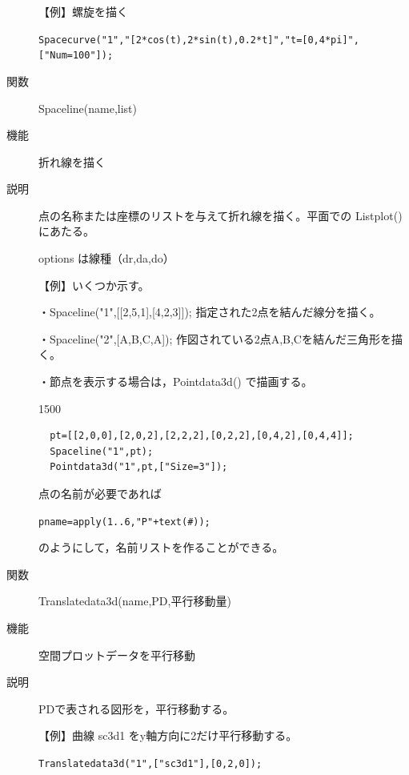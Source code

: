 \documentclass[papersize,a4paper,12pt,uplatex]{jsarticle}
\begin{document}
\begin{description}
\vspace{\baselineskip}
【例】螺旋を描く

\verb|Spacecurve("1","[2*cos(t),2*sin(t),0.2*t]","t=[0,4*pi]",["Num=100"]);|
    
\vspace{\baselineskip}
 \begin{center}  \end{center}

\hypertarget{spaceline}{}
\item[関数]  Spaceline(name,list)
\item[機能]  折れ線を描く
\item[説明]  点の名称または座標のリストを与えて折れ線を描く。平面での Listplot() にあたる。

options は線種（dr,da,do）

\vspace{\baselineskip}
【例】いくつか示す。

・Spaceline("1",[[2,5,1],[4,2,3]]);   指定された2点を結んだ線分を描く。

・Spaceline("2",[A,B,C,A]);  作図されている2点A,B,Cを結んだ三角形を描く。


・節点を表示する場合は，Pointdata3d() で描画する。

\begin{layer}{150}{0}
\end{layer}
\begin{verbatim}
  pt=[[2,0,0],[2,0,2],[2,2,2],[0,2,2],[0,4,2],[0,4,4]];
  Spaceline("1",pt);
  Pointdata3d("1",pt,["Size=3"]);
\end{verbatim}

点の名前が必要であれば

\verb|pname=apply(1..6,"P"+text(#));|

のようにして，名前リストを作ることができる。

\vspace{\baselineskip}
\hypertarget{translatedata3d}{}
\item[関数]  Translatedata3d(name,PD,平行移動量)
\item[機能]  空間プロットデータを平行移動
\item[説明]  PDで表される図形を，平行移動する。

\vspace{\baselineskip}
【例】曲線 sc3d1 をy軸方向に2だけ平行移動する。

\verb|Translatedata3d("1",["sc3d1"],[0,2,0]);|
    

\end{description}
\end{document}
